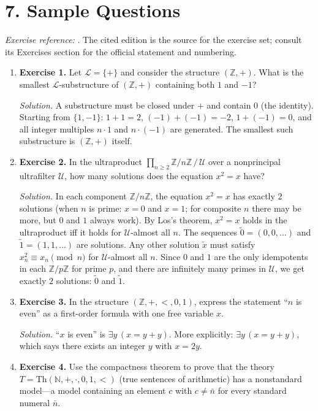 \section*{7. Sample Questions}
\emph{Exercise reference:} \cite{model_theory_ref1}. The cited edition is the source for the exercise set; consult its Exercises section for the official statement and numbering.
\begin{enumerate}[leftmargin=*,itemsep=0.9em]
\item \textbf{Exercise 1.} Let $\mathcal{L}=\{+\}$ and consider the structure $(\mathbb{Z},+)$. What is the smallest $\mathcal{L}$-substructure of $(\mathbb{Z},+)$ containing both $1$ and $-1$?

\emph{Solution.} A substructure must be closed under $+$ and contain $0$ (the identity). Starting from $\{1,-1\}$: $1+1=2$, $(-1)+(-1)=-2$, $1+(-1)=0$, and all integer multiples $n\cdot 1$ and $n\cdot(-1)$ are generated. The smallest such substructure is $(\mathbb{Z},+)$ itself.

\item \textbf{Exercise 2.} In the ultraproduct $\prod_{n\geq 2}\mathbb{Z}/n\mathbb{Z}\,/\,\mathcal{U}$ over a nonprincipal ultrafilter $\mathcal{U}$, how many solutions does the equation $x^2=x$ have?

\emph{Solution.} In each component $\mathbb{Z}/n\mathbb{Z}$, the equation $x^2=x$ has exactly $2$ solutions (when $n$ is prime: $x=0$ and $x=1$; for composite $n$ there may be more, but $0$ and $1$ always work). By Los's theorem, $x^2=x$ holds in the ultraproduct iff it holds for $\mathcal{U}$-almost all $n$. The sequences $\tilde{0}=(0,0,\ldots)$ and $\tilde{1}=(1,1,\ldots)$ are solutions. Any other solution $\tilde{x}$ must satisfy $x_n^2\equiv x_n\pmod{n}$ for $\mathcal{U}$-almost all $n$. Since $0$ and $1$ are the only idempotents in each $\mathbb{Z}/p\mathbb{Z}$ for prime $p$, and there are infinitely many primes in $\mathcal{U}$, we get exactly $2$ solutions: $\tilde{0}$ and $\tilde{1}$.

\item \textbf{Exercise 3.} In the structure $(\mathbb{Z},+,<,0,1)$, express the statement ``$n$ is even'' as a first-order formula with one free variable $x$.

\emph{Solution.} ``$x$ is even'' is $\exists y\,(x=y+y)$. More explicitly: $\exists y\,(x=y+y)$, which says there exists an integer $y$ with $x=2y$.

\item \textbf{Exercise 4.} Use the compactness theorem to prove that the theory $T=\mathrm{Th}(\mathbb{N},+,\cdot,0,1,<)$ (true sentences of arithmetic) has a nonstandard model---a model containing an element $c$ with $c\neq\bar{n}$ for every standard numeral $\bar{n}$.


\end{enumerate}
